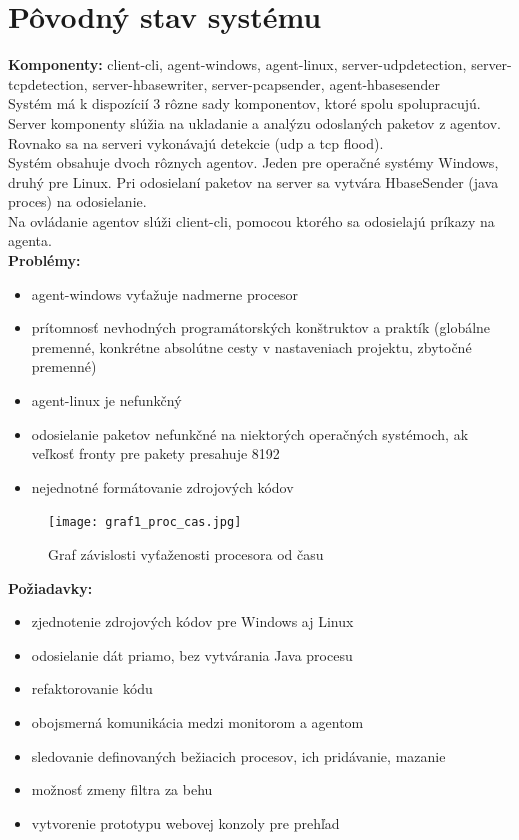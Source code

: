 \documentclass[a4paper,12pt]{article}
\begin{document}
\section{Pôvodný stav systému}
\textbf{Komponenty:} client-cli, agent-windows, agent-linux, server-udpdetection, server-tcpdetection, server-hbasewriter, server-pcapsender, agent-hbasesender \\

Systém má k dispozícií 3 rôzne sady komponentov, ktoré spolu spolupracujú.
Server komponenty slúžia na ukladanie a analýzu odoslaných paketov z agentov. Rovnako sa na serveri vykonávajú detekcie (udp a tcp flood). \\

Systém obsahuje dvoch rôznych agentov. Jeden pre operačné systémy Windows, druhý pre Linux. Pri odosielaní paketov na server sa vytvára HbaseSender (java proces) na odosielanie. \\

Na ovládanie agentov slúži client-cli, pomocou ktorého sa odosielajú príkazy na agenta. \\

\noindent \textbf{Problémy:}

\begin{itemize} 
	\item agent-windows vyťažuje nadmerne procesor
	\item prítomnosť nevhodných programátorských konštruktov a praktík (globálne premenné, konkrétne absolútne cesty v nastaveniach projektu, zbytočné premenné)
	\item agent-linux je nefunkčný
	\item odosielanie paketov nefunkčné na niektorých operačných systémoch, ak veľkosť fronty pre pakety presahuje 8192
	\item nejednotné formátovanie zdrojových kódov \\
\end{itemize}

\begin{figure}[h!]
	\centering
	\label{graf1}
	\texttt{[image: graf1\_proc\_cas.jpg]}
	\caption{Graf závislosti vyťaženosti procesora od času}
\end{figure}
\newpage

\noindent \textbf{Požiadavky: }
\begin{itemize} 
	\item zjednotenie zdrojových kódov pre Windows aj Linux
	\item odosielanie dát priamo, bez vytvárania Java procesu
	\item refaktorovanie kódu
	\item obojsmerná komunikácia medzi monitorom a agentom
	\item sledovanie definovaných bežiacich procesov, ich pridávanie, mazanie
	\item možnosť zmeny filtra za behu
	\item vytvorenie prototypu webovej konzoly pre prehľad \\
\end{itemize}
\newpage
\end{document}
